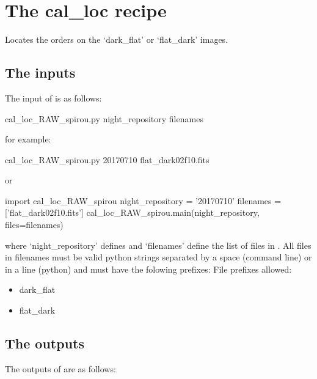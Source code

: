 \clearpage
\newpage
\section{The cal\_loc recipe}
\label{ch:the_recipes:cal_loc_RAW_spirou}

Locates the orders on the `dark\_flat' or `flat\_dark' images.\\

\subsection{The inputs}
The input of \callocRAW is as follows:
\begin{cmdbox}
cal_loc_RAW_spirou.py night_repository filenames
\end{cmdbox}
\noindent for example:
\begin{cmdbox}[title={example}]
cal_loc_RAW_spirou.py 20170710 flat_dark02f10.fits
\end{cmdbox}
\noindent or
\begin{pythonbox}
import cal_loc_RAW_spirou
night_repository = '20170710'
filenames = ['flat_dark02f10.fits']
cal_loc_RAW_spirou.main(night_repository, files=filenames)
\end{pythonbox}

\noindent where `night\_repository' defines \argnightname and `filenames' define the list of files in \argfilenames. All files in filenames must be valid python strings separated by a space (command line) or in a line (python) and must have the folowing prefixes:
\noindent File prefixes allowed:
\begin{itemize}
	\item dark\_flat
	\item flat\_dark
\end{itemize}

\subsection{The outputs}
The outputs of \callocRAW are as follows:

